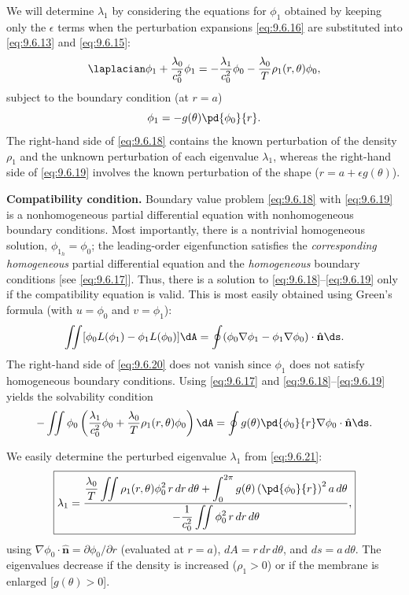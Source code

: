 We will determine $\lambda_1$ by considering the equations for $\phi_1$ obtained by keeping only the $\epsilon$ terms when the perturbation expansions \eqref{eq:9.6.16} are substituted into \eqref{eq:9.6.13} and \eqref{eq:9.6.15}:
\begin{equation}
\label{eq:9.6.18}
\laplacian\phi_1 + \frac{\lambda_0}{c_0^2}\phi_1 = -\frac{\lambda_1}{c_0^2}\phi_0 - \frac{\lambda_0}{T}\rho_1(r,\theta)\phi_0,
\end{equation}
subject to the boundary condition (at $r = a$)
\begin{equation}
\label{eq:9.6.19}
\phi_1 = -g(\theta)\pd{\phi_0}{r}.
\end{equation}
The right-hand side of \eqref{eq:9.6.18} contains the known perturbation of the density $\rho_1$ and the unknown perturbation of each eigenvalue $\lambda_1$, whereas the right-hand side of \eqref{eq:9.6.19} involves the known perturbation of the shape ($r = a + \epsilon g(\theta)$).

\textbf{Compatibility condition.}
Boundary value problem \eqref{eq:9.6.18} with \eqref{eq:9.6.19} is a nonhomogeneous partial differential equation with nonhomogeneous boundary conditions.  Most importantly, there is a nontrivial homogeneous solution, $\phi_{1_h} = \phi_0$; the leading-order eigenfunction satisfies the \emph{corresponding homogeneous} partial differential equation and the \emph{homogeneous} boundary conditions [see \eqref{eq:9.6.17}].  Thus, there is a solution to \eqref{eq:9.6.18}--\eqref{eq:9.6.19} only if the compatibility equation is valid.  This is most easily obtained using Green's formula (with $u = \phi_0$ and $v = \phi_1$):
\begin{equation}
\label{eq:9.6.20}
\iint [\phi_0 L(\phi_1) - \phi_1 L(\phi_0)]\dA = \oint(\phi_0\nabla\phi_1 - \phi_1\nabla\phi_0)\cdot\hat{\mathbf{n}}\ds.
\end{equation}
The right-hand side of \eqref{eq:9.6.20} does not vanish since $\phi_1$ does not satisfy homogeneous boundary conditions.  Using \eqref{eq:9.6.17} and \eqref{eq:9.6.18}--\eqref{eq:9.6.19} yields the solvability condition
\begin{equation}
\label{eq:9.6.21}
-\iint\phi_0\left(\frac{\lambda_1}{c_0^2}\phi_0 + \frac{\lambda_0}{T}\rho_1(r,\theta)\phi_0\right)\dA = \oint g(\theta)\pd{\phi_0}{r}\nabla\phi_0\cdot\hat{\mathbf{n}}\ds.
\end{equation}

We easily determine the perturbed eigenvalue $\lambda_1$ from \eqref{eq:9.6.21}:
\begin{equation}
\label{eq:9.6.22}
\boxed{\lambda_1 = \frac{\dfrac{\lambda_0}{T}\displaystyle\iint\rho_1(r,\theta)\phi_0^2\,r\,dr\,d\theta + \int_0^{2\pi}g(\theta)\left(\pd{\phi_0}{r}\right)^2 a\,d\theta}{-\dfrac{1}{c_0^2}\displaystyle\iint\phi_0^2\,r\,dr\,d\theta},}
\end{equation}
using $\nabla\phi_0\cdot\hat{\mathbf{n}} = \partial\phi_0/\partial r$ (evaluated at $r = a$), $dA = r\,dr\,d\theta$, and $ds = a\,d\theta$.  The eigenvalues decrease if the density is increased ($\rho_1 > 0$) or if the membrane is enlarged [$g(\theta) > 0$].

